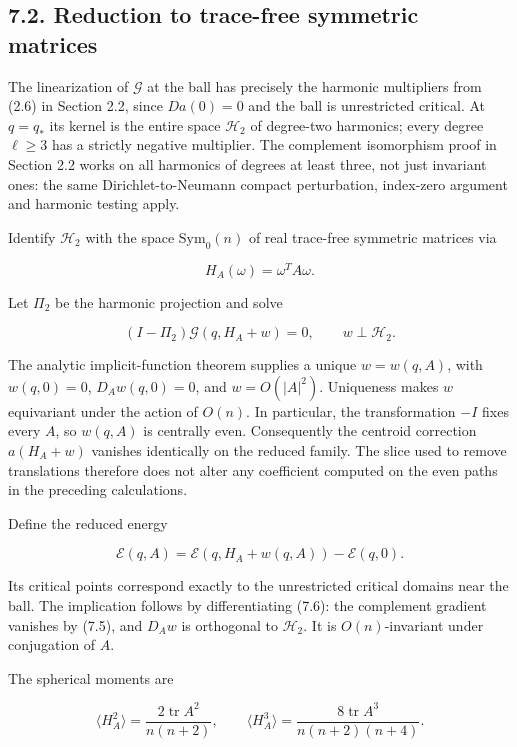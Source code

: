 \documentclass[11pt]{article}
\begin{document}
\subsection{7.2. Reduction to trace-free symmetric
matrices}\label{reduction-to-trace-free-symmetric-matrices}

The linearization of \(\mathcal G\) at the ball has precisely the
harmonic multipliers from (2.6) in Section 2.2, since \(Da(0)=0\) and
the ball is unrestricted critical. At \(q=q_*\) its kernel is the entire
space \(\mathcal H_2\) of degree-two harmonics; every degree
\(\ell\ge3\) has a strictly negative multiplier. The complement
isomorphism proof in Section 2.2 works on all harmonics of degrees at
least three, not just invariant ones: the same Dirichlet-to-Neumann
compact perturbation, index-zero argument and harmonic testing apply.

Identify \(\mathcal H_2\) with the space \(\mathrm{Sym}_0(n)\) of real
trace-free symmetric matrices via

\[
H_A(\omega)=\omega^TA\omega.
\tag{7.4}
\]

Let \(\Pi_2\) be the harmonic projection and solve

\[
(I-\Pi_2)\mathcal G(q,H_A+w)=0,\qquad w\perp\mathcal H_2.
\tag{7.5}
\]

The analytic implicit-function theorem supplies a unique \(w=w(q,A)\),
with \(w(q,0)=0\), \(D_Aw(q,0)=0\), and \(w=O(|A|^2)\). Uniqueness makes
\(w\) equivariant under the action of \(O(n)\). In particular, the
transformation \(-I\) fixes every \(A\), so \(w(q,A)\) is centrally
even. Consequently the centroid correction \(a(H_A+w)\) vanishes
identically on the reduced family. The slice used to remove translations
therefore does not alter any coefficient computed on the even paths in
the preceding calculations.

Define the reduced energy

\[
\mathscr E(q,A)=\mathcal E(q,H_A+w(q,A))-\mathcal E(q,0).
\tag{7.6}
\]

Its critical points correspond exactly to the unrestricted critical
domains near the ball. The implication follows by differentiating (7.6):
the complement gradient vanishes by (7.5), and \(D_Aw\) is orthogonal to
\(\mathcal H_2\). It is \(O(n)\)-invariant under conjugation of \(A\).

The spherical moments are

\[
\langle H_A^2\rangle=\frac{2\operatorname{tr}A^2}{n(n+2)},
\qquad
\langle H_A^3\rangle=\frac{8\operatorname{tr}A^3}{n(n+2)(n+4)}.
\tag{7.7}
\]
\end{document}
